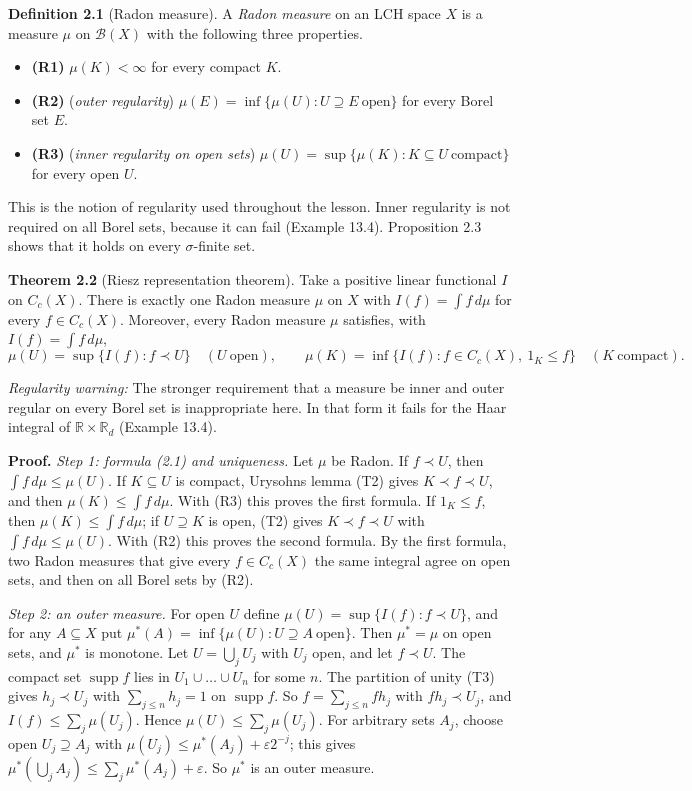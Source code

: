 \documentclass[
  english,
  11pt,
  a4paper,
]{article}
\providecommand{\tightlist}{%
  \setlength{\itemsep}{0pt}\setlength{\parskip}{0pt}}
\begin{document}
\textbf{Definition 2.1} (Radon measure). A \emph{Radon measure} on an
LCH space \(X\) is a measure \(\mu\) on \(\mathcal B(X)\) with the
following three properties.

\begin{itemize}
\tightlist
\item
  \textbf{(R1)} \(\mu(K)<\infty\) for every compact \(K\).
\item
  \textbf{(R2)} (\emph{outer regularity})
  \(\mu(E)=\inf\{\mu(U):U\supseteq E\ \text{open}\}\) for every Borel
  set \(E\).
\item
  \textbf{(R3)} (\emph{inner regularity on open sets})
  \(\mu(U)=\sup\{\mu(K):K\subseteq U\ \text{compact}\}\) for every open
  \(U\).
\end{itemize}

This is the notion of regularity used throughout the lesson. Inner
regularity is not required on all Borel sets, because it can fail
(Example 13.4). Proposition 2.3 shows that it holds on every
\(\sigma\)-finite set.

\textbf{Theorem 2.2} (Riesz representation theorem). Take a positive
linear functional \(I\) on \(C_c(X)\). There is exactly one Radon
measure \(\mu\) on \(X\) with \(I(f)=\int f\,d\mu\) for every
\(f\in C_c(X)\). Moreover, every Radon measure \(\mu\) satisfies, with
\(I(f)=\int f\,d\mu\),
\[\mu(U)=\sup\{I(f):f\prec U\}\quad(U\ \text{open}),\qquad
\mu(K)=\inf\{I(f):f\in C_c(X),\ 1_K\leq f\}\quad(K\ \text{compact}).
\tag{2.1}\]

\emph{Regularity warning:} The stronger requirement that a measure be
inner and outer regular on every Borel set is inappropriate here. In
that form it fails for the Haar integral of
\(\mathbb R\times\mathbb R_d\) (Example 13.4).

\textbf{Proof.} \emph{Step 1: formula (2.1) and uniqueness.} Let \(\mu\)
be Radon. If \(f\prec U\), then \(\int f\,d\mu\leq\mu(U)\). If
\(K\subseteq U\) is compact, Urysohn\textquotesingle s lemma (T2) gives
\(K\prec f\prec U\), and then \(\mu(K)\leq\int f\,d\mu\). With (R3) this
proves the first formula. If \(1_K\leq f\), then
\(\mu(K)\leq\int f\,d\mu\); if \(U\supseteq K\) is open, (T2) gives
\(K\prec f\prec U\) with \(\int f\,d\mu\leq\mu(U)\). With (R2) this
proves the second formula. By the first formula, two Radon measures that
give every \(f\in C_c(X)\) the same integral agree on open sets, and
then on all Borel sets by (R2).

\emph{Step 2: an outer measure.} For open \(U\) define
\(\mu(U)=\sup\{I(f):f\prec U\}\), and for any \(A\subseteq X\) put
\(\mu^*(A)=\inf\{\mu(U):U\supseteq A\ \text{open}\}\). Then
\(\mu^*=\mu\) on open sets, and \(\mu^*\) is monotone. Let
\(U=\bigcup_jU_j\) with \(U_j\) open, and let \(f\prec U\). The compact
set \(\operatorname{supp}f\) lies in \(U_1\cup\dots\cup U_n\) for some
\(n\). The partition of unity (T3) gives \(h_j\prec U_j\) with
\(\sum_{j\leq n}h_j=1\) on \(\operatorname{supp}f\). So
\(f=\sum_{j\leq n}fh_j\) with \(fh_j\prec U_j\), and
\(I(f)\leq\sum_j\mu(U_j)\). Hence \(\mu(U)\leq\sum_j\mu(U_j)\). For
arbitrary sets \(A_j\), choose open \(U_j\supseteq A_j\) with
\(\mu(U_j)\leq\mu^*(A_j)+\varepsilon2^{-j}\); this gives
\(\mu^*(\bigcup_jA_j)\leq\sum_j\mu^*(A_j)+\varepsilon\). So \(\mu^*\) is
an outer measure.
\end{document}
